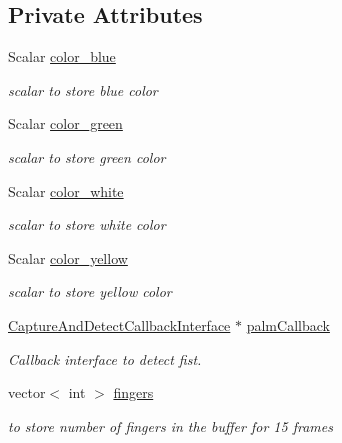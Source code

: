 \subsection*{Private Attributes}
\begin{DoxyCompactItemize}
\item 
Scalar \hyperlink{class_gesture_detection_1_1_finger_counter_a0081a8ce412b872f627f8540baeddd19}{color\+\_\+blue}
\begin{DoxyCompactList}\small\item\em scalar to store blue color \end{DoxyCompactList}\item 
Scalar \hyperlink{class_gesture_detection_1_1_finger_counter_a937a79c7b41ecffd6e2c56ca812b06a2}{color\+\_\+green}
\begin{DoxyCompactList}\small\item\em scalar to store green color \end{DoxyCompactList}\item 
Scalar \hyperlink{class_gesture_detection_1_1_finger_counter_a6db55f356b9d9c3caccfe94d8a0d6ff3}{color\+\_\+white}
\begin{DoxyCompactList}\small\item\em scalar to store white color \end{DoxyCompactList}\item 
Scalar \hyperlink{class_gesture_detection_1_1_finger_counter_a9382982af059fcae51ee2c28e4392271}{color\+\_\+yellow}
\begin{DoxyCompactList}\small\item\em scalar to store yellow color \end{DoxyCompactList}\item 
\hyperlink{class_gestro_1_1_capture_and_detect_callback_interface}{Capture\+And\+Detect\+Callback\+Interface} $\ast$ \hyperlink{class_gesture_detection_1_1_finger_counter_adfc37a4aa3d94645e5c1eb59b47a755d}{palm\+Callback}
\begin{DoxyCompactList}\small\item\em Callback interface to detect fist. \end{DoxyCompactList}\item 
vector$<$ int $>$ \hyperlink{class_gesture_detection_1_1_finger_counter_abd8a550123de746dfcfb2e52063f664f}{fingers}
\begin{DoxyCompactList}\small\item\em to store number of fingers in the buffer for 15 frames \end{DoxyCompactList}\item 

\end{DoxyCompactItemize}
